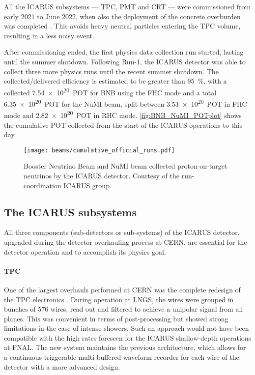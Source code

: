 All the ICARUS subsystems --- TPC, PMT and CRT --- were commissioned from early 2021 to June 2022, when also the deployment of the concrete overburden was completed \cite{abratenkoICARUSFermilabShortBaseline2023}. This avoids heavy neutral particles entering the TPC volume, resulting in a less noisy event. 

After commissioning ended, the first physics data collection run started, lasting until the summer shutdown. Following Run-1, the ICARUS detector was able to collect three more physics runs until the recent summer shutdown. The collected/delivered efficiency is estimated to be greater than \SI{95}{\percent}, with a collected \SI{7.54e20}{POT} for BNB using the FHC mode and a total \SI{6.35e20}{POT} for the NuMI beam, split between \SI{3.53e20}{POT} in FHC mode and \SI{2.82e20}{POT} in RHC mode. \autoref{fig:BNB_NuMI_POTplot} shows the cumulative POT collected from the start of the ICARUS operations to this day. 

\begin{figure}
    \centering
    \texttt{[image: beams/cumulative\_official\_runs.pdf]}
    \caption[BNB and NuMI collected POT]{Booster Neutrino Beam and NuMI beam collected proton-on-target neutrinos by the ICARUS detector. Courtesy of the run-coordination ICARUS group. }
    \label{fig:BNB_NuMI_POTplot}
\end{figure}

\subsection{The ICARUS subsystems} 

All three components (sub-detectors or sub-systems) of the ICARUS detector, upgraded during the detector overhauling process at CERN, are essential for the detector operation and to accomplish its physics goal.

\paragraph{TPC} One of the largest overhauls performed at CERN was the complete redesign of the TPC electronics \cite{bagbyOverhaulInstallationICARUST6002021}. During operation at LNGS, the wires were grouped in bunches of 576 wires, read out and filtered to achieve a unipolar signal from all planes. This was convenient in terms of post-processing but showed strong limitations in the case of intense showers. Such an approach would not have been compatible with the high rates foreseen for the ICARUS shallow-depth operations at FNAL. The new system maintains the previous architecture, which allows for a continuous triggerable  multi-buffered waveform recorder for each wire of the detector with a more advanced design. 

